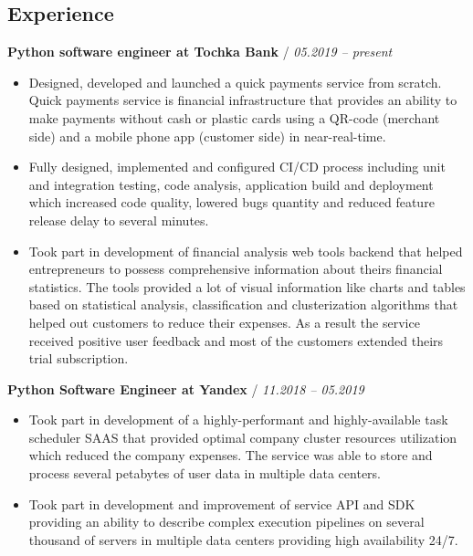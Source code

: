 \documentclass[a4paper,10pt]{article}
\newcommand{\notice}[1]{{\textcolor{dark}{\textbf{#1}}}}
\begin{document}
\subsection*{Experience}

    \begin{adjustwidth}{10pt}{10pt}

        \notice{Python software engineer at Tochka Bank} / \textit{05.2019 – present}

        \begin{itemize}

        \item Designed, developed and launched a quick payments service from scratch. Quick payments service is financial infrastructure that provides an ability to make payments without cash or plastic cards using a QR-code (merchant side) and a mobile phone app (customer side) in near-real-time.

        \item Fully designed, implemented and configured CI/CD process including unit and integration testing, code analysis, application build and deployment which increased code quality, lowered bugs quantity and reduced feature release delay to several minutes.

        \item Took part in development of financial analysis web tools backend that helped entrepreneurs to possess comprehensive information about theirs financial statistics. The tools provided a lot of visual information like charts and tables based on statistical analysis, classification and clusterization algorithms that helped out customers to reduce their expenses. As a result the service received positive user feedback and most of the customers extended theirs trial subscription.

        \end{itemize}


        \notice{Python Software Engineer at Yandex} / \textit{11.2018 – 05.2019}

        \begin{itemize}

        \item Took part in development of a highly-performant and highly-available task scheduler SAAS that provided optimal company cluster resources utilization which reduced the company expenses. The service was able to store and process several petabytes of user data in multiple data centers.

        \item Took part in development and improvement of service API and SDK providing an ability to describe complex execution pipelines on several thousand of servers in multiple data centers providing high availability 24/7.


\end{itemize}
\end{adjustwidth}
\end{document}

